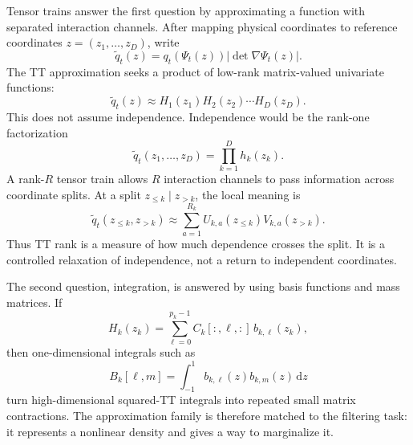 \documentclass[11pt]{article}
\numberwithin{equation}{section}
\newcommand{\dd}{\,\mathrm d}
\begin{document}
Tensor trains answer the first question by approximating a function with
separated interaction channels.  After mapping physical coordinates to
reference coordinates \(z=(z_1,\ldots,z_D)\), write
\begin{equation}
    \widetilde q_t(z)
    =
    q_t(\Psi_t(z))\left|\det\nabla\Psi_t(z)\right|.
    \label{eq:p25-bridge-8}
\end{equation}
The TT approximation seeks a product of low-rank matrix-valued univariate
functions:
\begin{equation}
    \widetilde q_t(z)
    \approx
    H_1(z_1)H_2(z_2)\cdots H_D(z_D).
    \label{eq:p25-bridge-9}
\end{equation}
This does not assume independence.  Independence would be the rank-one
factorization
\begin{equation}
    \widetilde q_t(z_1,\ldots,z_D)
    =
    \prod_{k=1}^D h_k(z_k).
    \label{eq:p25-bridge-10}
\end{equation}
A rank-\(R\) tensor train allows \(R\) interaction channels to pass information
across coordinate splits.  At a split \(z_{\le k}\mid z_{>k}\), the local
meaning is
\begin{equation}
    \widetilde q_t(z_{\le k},z_{>k})
    \approx
    \sum_{a=1}^{R_k}
    U_{k,a}(z_{\le k})V_{k,a}(z_{>k}).
    \label{eq:p25-bridge-11}
\end{equation}
Thus TT rank is a measure of how much dependence crosses the split.  It is a
controlled relaxation of independence, not a return to independent coordinates.

The second question, integration, is answered by using basis functions and mass
matrices.  If
\begin{equation}
    H_k(z_k)=\sum_{\ell=0}^{p_k-1} C_k[:,\ell,:]\,b_{k,\ell}(z_k),
    \label{eq:p25-bridge-12}
\end{equation}
then one-dimensional integrals such as
\begin{equation}
    B_k[\ell,m]
    =
    \int_{-1}^{1}b_{k,\ell}(z)b_{k,m}(z)\dd z
    \label{eq:p25-bridge-13}
\end{equation}
turn high-dimensional squared-TT integrals into repeated small matrix
contractions.  The approximation family is therefore matched to the filtering
task: it represents a nonlinear density and gives a way to marginalize it.
\end{document}
